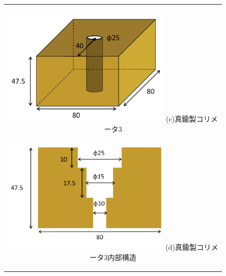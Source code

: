 \begin{figure}[H]
	\centering
		\begin{tabular}{c}
			\begin{minipage}{0.5\hsize}
				\centering
					\includegraphics[width=80mm]{fig/isb/collimator3.png}
					\hspace{1.6cm} (c)真鍮製コリメータ3
			\end{minipage}
			\begin{minipage}{0.5\hsize}
				\centering
					\includegraphics[width=80mm]{fig/isb/collimator4.png}
					\hspace{1.6cm} (d)真鍮製コリメータ3内部構造
			\end{minipage}
		\end{tabular}
	\end{figure}
